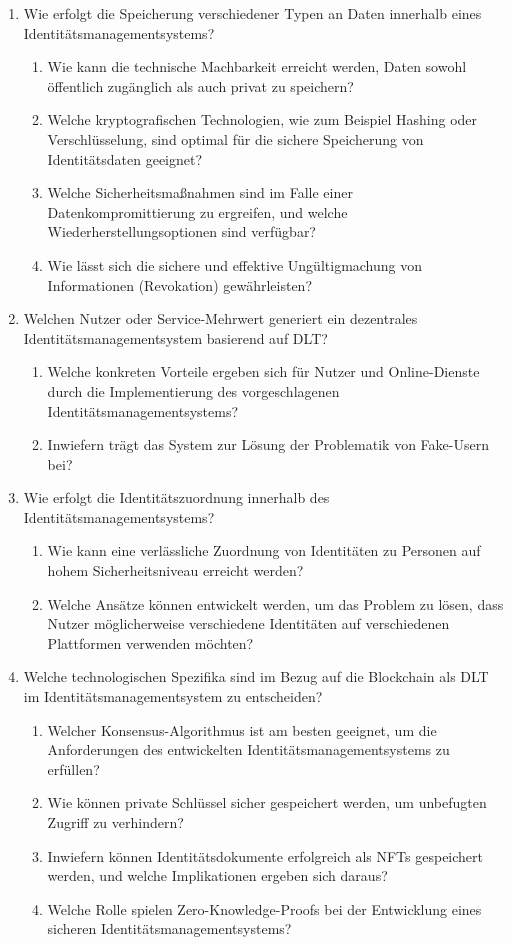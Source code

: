 \begin{enumerate}
\item Wie erfolgt die Speicherung verschiedener Typen an Daten innerhalb eines Identitätsmanagementsystems?
\begin{enumerate}
	\item Wie kann die technische Machbarkeit erreicht werden, Daten sowohl öffentlich zugänglich als auch privat zu speichern?
	\item Welche kryptografischen Technologien, wie zum Beispiel Hashing oder Verschlüsselung, sind optimal für die sichere Speicherung von Identitätsdaten geeignet?
	\item Welche Sicherheitsmaßnahmen sind im Falle einer Datenkompromittierung zu ergreifen, und welche Wiederherstellungsoptionen sind verfügbar?
	\item Wie lässt sich die sichere und effektive Ungültigmachung von Informationen (Revokation) gewährleisten?
\end{enumerate}

\item Welchen Nutzer oder Service-Mehrwert generiert ein dezentrales Identitätsmanagementsystem basierend auf DLT?
\begin{enumerate}
	\item Welche konkreten Vorteile ergeben sich für Nutzer und Online-Dienste durch die Implementierung des vorgeschlagenen Identitätsmanagementsystems?
	\item Inwiefern trägt das System zur Lösung der Problematik von Fake-Usern bei?
\end{enumerate}

\item Wie erfolgt die Identitätszuordnung innerhalb des Identitätsmanagementsystems?
\begin{enumerate}
	\item Wie kann eine verlässliche Zuordnung von Identitäten zu Personen auf hohem Sicherheitsniveau erreicht werden?
	\item Welche Ansätze können entwickelt werden, um das Problem zu lösen, dass Nutzer möglicherweise verschiedene Identitäten auf verschiedenen Plattformen verwenden möchten?
\end{enumerate}

\item Welche technologischen Spezifika sind im Bezug auf die Blockchain als DLT im Identitätsmanagementsystem zu entscheiden?
\begin{enumerate}
	\item Welcher Konsensus-Algorithmus ist am besten geeignet, um die Anforderungen des entwickelten Identitätsmanagementsystems zu erfüllen?
	\item Wie können private Schlüssel sicher gespeichert werden, um unbefugten Zugriff zu verhindern?
	\item Inwiefern können Identitätsdokumente erfolgreich als NFTs gespeichert werden, und welche Implikationen ergeben sich daraus?
	\item Welche Rolle spielen Zero-Knowledge-Proofs bei der Entwicklung eines sicheren Identitätsmanagementsystems?
\end{enumerate}
\end{enumerate}

